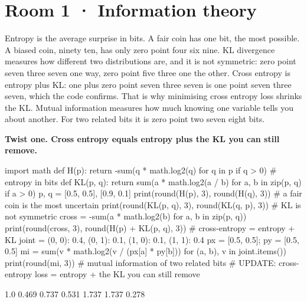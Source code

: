 \documentclass[11pt,a4paper]{report}
\begin{document}
\section*{Room 1 · Information theory}
Entropy is the average surprise in bits. A fair coin has one bit, the most possible. A biased coin, ninety ten, has only zero point four six nine. KL divergence measures how different two distributions are, and it is not symmetric: zero point seven three seven one way, zero point five three one the other. Cross entropy is entropy plus KL: one plus zero point seven three seven is one point seven three seven, which the code confirms. That is why minimising cross entropy loss shrinks the KL. Mutual information measures how much knowing one variable tells you about another. For two related bits it is zero point two seven eight bits.
\begin{tcolorbox}[colback=yellow!12,colframe=orange!70!black,boxrule=0.4pt,left=4pt,right=4pt,top=2pt,bottom=2pt]\textbf{Twist one. Cross entropy equals entropy plus the KL you can still remove.}\end{tcolorbox}
\begin{Code}
import math
def H(p): return -sum(q * math.log2(q) for q in p if q > 0)        # entropy in bits
def KL(p, q): return sum(a * math.log2(a / b) for a, b in zip(p, q) if a > 0)
p, q = [0.5, 0.5], [0.9, 0.1]
print(round(H(p), 3), round(H(q), 3))       # a fair coin is the most uncertain
print(round(KL(p, q), 3), round(KL(q, p), 3))      # KL is not symmetric
cross = -sum(a * math.log2(b) for a, b in zip(p, q))
print(round(cross, 3), round(H(p) + KL(p, q), 3))  # cross-entropy = entropy + KL
joint = {(0, 0): 0.4, (0, 1): 0.1, (1, 0): 0.1, (1, 1): 0.4}
px = [0.5, 0.5]; py = [0.5, 0.5]
mi = sum(v * math.log2(v / (px[a] * py[b])) for (a, b), v in joint.items())
print(round(mi, 3))                         # mutual information of two related bits
# UPDATE: cross-entropy loss = entropy + the KL you can still remove
\end{Code}
\begin{Out}
1.0 0.469
0.737 0.531
1.737 1.737
0.278
\end{Out}
\end{document}
